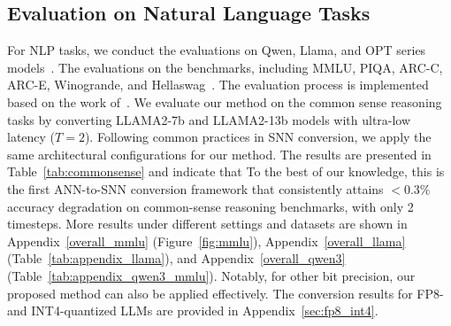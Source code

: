 
\subsection{Evaluation on Natural Language Tasks}

For NLP tasks, we conduct the evaluations on Qwen, Llama, and OPT series models~\cite{qwen3,llama2,zhang2022opt}. The evaluations  on the  benchmarks, including MMLU, PIQA, ARC-C, ARC-E, Winogrande, and Hellaswag~\cite{mmlu,piqa,wiqa, arc}. The evaluation process is implemented based on the work of~\cite{eval-harness}. We evaluate our method on the common sense reasoning tasks by converting LLAMA2-7b and LLAMA2-13b models with ultra-low latency ($T=2$). Following common practices in SNN conversion, we apply the same architectural configurations for our method. 
The results are presented in Table~\ref{tab:commonsense} and indicate that 
To the best of our knowledge, this is the first ANN-to-SNN conversion framework that consistently attains $<$0.3\% accuracy degradation on common-sense reasoning benchmarks, with only 2 timesteps. 
More results under different settings and datasets are shown in Appendix~\ref{overall_mmlu} (Figure~\ref{fig:mmlu}), Appendix~\ref{overall_llama} (Table~\ref{tab:appendix_llama}), and Appendix~\ref{overall_qwen3} (Table~\ref{tab:appendix_qwen3_mmlu}).
Notably, for other bit precision, our proposed method can also be applied effectively. 
The conversion results for FP8- and INT4-quantized LLMs are provided in Appendix~\ref{sec:fp8_int4}.


